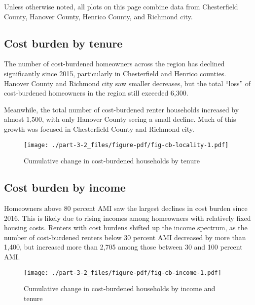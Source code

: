 \documentclass[
  letterpaper,
  DIV=11,
  numbers=noendperiod]{scrreprt}
\begin{document}
Unless otherwise noted, all plots on this page combine data from
Chesterfield County, Hanover County, Henrico County, and Richmond city.

\hypertarget{cost-burden-by-tenure}{%
\subsection{Cost burden by tenure}\label{cost-burden-by-tenure}}

The number of cost-burdened homeowners across the region has declined
significantly since 2015, particularly in Chesterfield and Henrico
counties. Hanover County and Richmond city saw smaller decreases, but
the total ``loss'' of cost-burdened homeowners in the region still
exceeded 6,300.

Meanwhile, the total number of cost-burdened renter households increased
by almost 1,500, with only Hanover County seeing a small decline. Much
of this growth was focused in Chesterfield County and Richmond city.

\begin{figure}

{\centering \texttt{[image: ./part-3-2\_files/figure-pdf/fig-cb-locality-1.pdf]}

}

\caption{\label{fig-cb-locality}Cumulative change in cost-burdened
households by tenure}

\end{figure}

\hypertarget{cost-burden-by-income}{%
\subsection{Cost burden by income}\label{cost-burden-by-income}}

Homeowners above 80 percent AMI saw the largest declines in cost burden
since 2016. This is likely due to rising incomes among homeowners with
relatively fixed housing costs. Renters with cost burdens shifted up the
income spectrum, as the number of cost-burdened renters below 30 percent
AMI decreased by more than 1,400, but increased more than 2,705 among
those between 30 and 100 percent AMI.

\begin{figure}

{\centering \texttt{[image: ./part-3-2\_files/figure-pdf/fig-cb-income-1.pdf]}

}

\caption{\label{fig-cb-income}Cumulative change in cost-burdened
households by income and tenure}

\end{figure}
\end{document}
